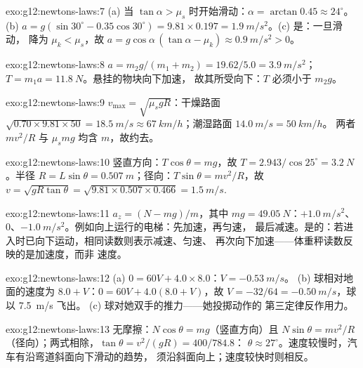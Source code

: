 \begin{solution}{exo:g12:newtons-laws:7}
(a) 当 $\tan\alpha > \mu_s$ 时开始滑动：$\alpha = \arctan 0.45 \approx
24^\circ$。(b) $a = g(\sin 30^\circ - 0.35\cos 30^\circ) =
9.81 \times 0.197 = \qty{1.9}{m/s^2}$。(c) 是：一旦滑动，
降为 $\mu_k < \mu_s$，故
$a = g\cos\alpha\,(\tan\alpha - \mu_k) \approx \qty{0.9}{m/s^2} > 0$。
\end{solution}

\begin{solution}{exo:g12:newtons-laws:8}
$a = m_2 g/(m_1 + m_2) = 19.62/5.0 = \qty{3.9}{m/s^2}$；
$T = m_1 a = \qty{11.8}{N}$。悬挂的物块向下加速，
故其所受向下：$T$ 必须小于 $m_2 g$。
\end{solution}

\begin{solution}{exo:g12:newtons-laws:9}
$v_{\max} = \sqrt{\mu_s g R}$：干燥路面
$\sqrt{0.70 \times 9.81 \times 50} = \qty{18.5}{m/s} \approx
\qty{67}{km/h}$；潮湿路面 $\qty{14.0}{m/s} = \qty{50}{km/h}$。
两者 $mv^2/R$ 与 $\mu_s mg$ 均含 $m$，故约去。
\end{solution}

\begin{solution}{exo:g12:newtons-laws:10}
竖直方向：$T\cos\theta = mg$，故
$T = 2.943/\cos 25^\circ = \qty{3.2}{N}$。半径 $R = L\sin\theta =
\qty{0.507}{m}$；径向：$T\sin\theta = mv^2/R$，故
$v = \sqrt{gR\tan\theta} = \sqrt{9.81 \times 0.507 \times 0.466}
= \qty{1.5}{m/s}$.
\end{solution}

\begin{solution}{exo:g12:newtons-laws:11}
$a_z = (N - mg)/m$，其中 $mg = \qty{49.05}{N}$：$+\qty{1.0}{m/s^2}$、
$0$、$-\qty{1.0}{m/s^2}$。例如向上运行的电梯：先加速，再匀速，
最后减速。是的：若进入时已向下运动，相同读数则表示减速、匀速、
再次向下加速——体重秤读数反映的是加速度，而非
速度。
\end{solution}

\begin{solution}{exo:g12:newtons-laws:12}
(a) $0 = 60V + 4.0 \times 8.0$：$V = \qty{-0.53}{m/s}$。
(b) 球相对地面的速度为 $8.0 + V$：$0 = 60V + 4.0(8.0 + V)$，故
$V = -32/64 = \qty{-0.50}{m/s}$，球以 \qty{7.5}{m/s} 飞出。
(c) 球对她双手的推力——她投掷动作的
第三定律反作用力。
\end{solution}

\begin{solution}{exo:g12:newtons-laws:13}
无摩擦：$N\cos\theta = mg$（竖直方向）且 $N\sin\theta =
mv^2/R$（径向）；两式相除，$\tan\theta = v^2/(gR) = 400/784.8$：
$\theta \approx 27^\circ$。速度较慢时，汽车有沿弯道斜面向下滑动的趋势，
须沿斜面向上；速度较快时则相反。
\end{solution}

